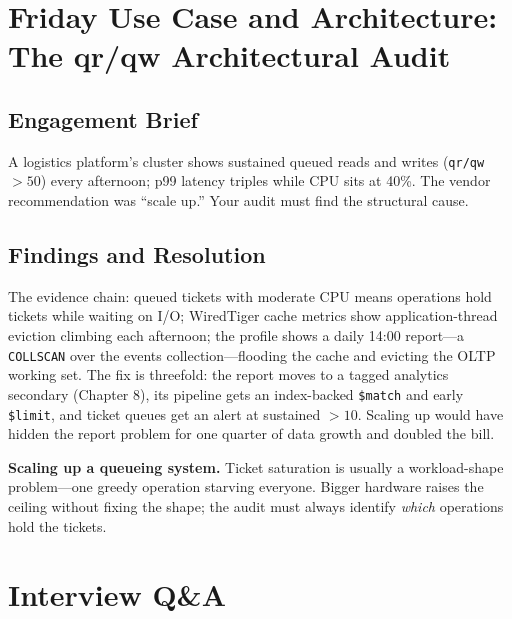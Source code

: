 \section{Friday Use Case and Architecture: The qr/qw Architectural Audit}
\subsection{Engagement Brief}
A logistics platform's cluster shows sustained queued reads and writes (\texttt{qr/qw} $> 50$) every afternoon; p99 latency triples while CPU sits at 40\%. The vendor recommendation was ``scale up.'' Your audit must find the structural cause.

\subsection{Findings and Resolution}
The evidence chain: queued tickets with moderate CPU means operations hold tickets while waiting on I/O; WiredTiger cache metrics show application-thread eviction climbing each afternoon; the profile shows a daily 14:00 report---a \texttt{COLLSCAN} over the events collection---flooding the cache and evicting the OLTP working set. The fix is threefold: the report moves to a tagged analytics secondary (Chapter 8), its pipeline gets an index-backed \texttt{\$match} and early \texttt{\$limit}, and ticket queues get an alert at sustained $>10$. Scaling up would have hidden the report problem for one quarter of data growth and doubled the bill.

\begin{pitfall}
\textbf{Scaling up a queueing system.} Ticket saturation is usually a workload-shape problem---one greedy operation starving everyone. Bigger hardware raises the ceiling without fixing the shape; the audit must always identify \emph{which} operations hold the tickets.
\end{pitfall}

\section{Interview Q\&A}
